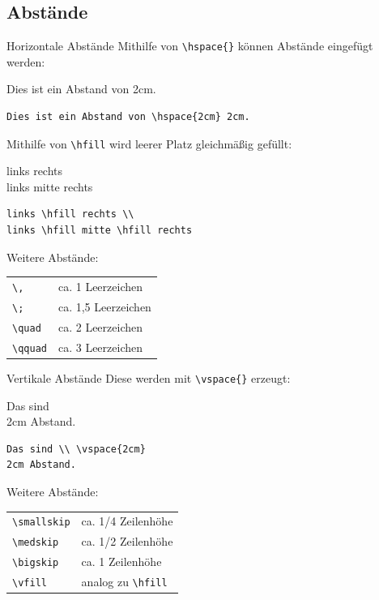 \documentclass[xcolor=dvipsnames]{beamer}
\begin{document}
\subsection{Abstände}
\begin{frame}[fragile]{Horizontale Abstände}
Mithilfe von \lstinline|\hspace{}| können Abstände eingefügt werden: \par\medskip
Dies ist ein Abstand von \hspace{2cm} 2cm.
\begin{lstlisting}
Dies ist ein Abstand von \hspace{2cm} 2cm.
\end{lstlisting}
Mithilfe von \lstinline|\hfill| wird leerer Platz gleichmäßig gefüllt: \par\medskip
links \hfill rechts \\
links \hfill mitte \hfill rechts\\
\begin{lstlisting}
links \hfill rechts \\
links \hfill mitte \hfill rechts
\end{lstlisting}
Weitere Abstände: \par\medskip
{\footnotesize
\begin{tabular}{|l|l|}
\hline
\verb|\,| & ca. 1 Leerzeichen \\
\verb|\;| & ca. 1,5 Leerzeichen \\
\verb|\quad| & ca. 2 Leerzeichen \\
\verb|\qquad| & ca. 3 Leerzeichen \\ \hline
\end{tabular}
}
\end{frame}


\begin{frame}[fragile]{Vertikale Abstände}
Diese werden mit \lstinline|\vspace{}| erzeugt: \par\medskip
Das sind \\ \vspace{2cm}
2cm Abstand.
\begin{lstlisting}
Das sind \\ \vspace{2cm}
2cm Abstand.
\end{lstlisting}
Weitere Abstände: \par\medskip
{\footnotesize
\begin{tabular}{|l|l|}
\hline
\verb|\smallskip| & ca. 1/4 Zeilenhöhe \\
\verb|\medskip| & ca. 1/2 Zeilenhöhe \\
\verb|\bigskip| & ca. 1 Zeilenhöhe \\
\verb|\vfill| & analog zu \lstinline|\hfill| \\ \hline
\end{tabular}
}
\end{frame}
\end{document}
